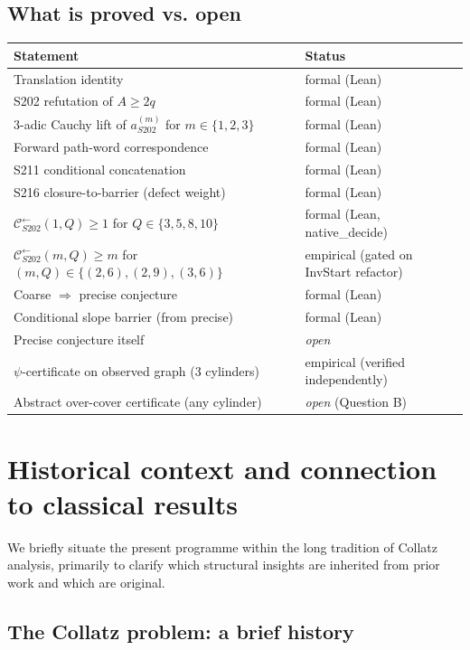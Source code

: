 \documentclass[11pt,a4paper]{article}
\theoremstyle{plain}
\theoremstyle{definition}
\newcommand{\aSat}{a_{S202}^{(m)}}
\newcommand{\Cback}{\mathcal{C}^{\!\leftarrow}_{S202}}
\begin{document}
\subsection*{What is proved vs. open}

\begin{center}\small
\begin{tabular}{p{8cm}l}
\toprule
Statement & Status \\
\midrule
Translation identity & formal (Lean) \\
S202 refutation of $A \ge 2q$ & formal (Lean) \\
3-adic Cauchy lift of $\aSat$ for $m \in \{1, 2, 3\}$ & formal (Lean) \\
Forward path-word correspondence & formal (Lean) \\
S211 conditional concatenation & formal (Lean) \\
S216 closure-to-barrier (defect weight) & formal (Lean) \\
$\Cback(1, Q) \ge 1$ for $Q \in \{3, 5, 8, 10\}$ & formal (Lean, native\_decide) \\
$\Cback(m, Q) \ge m$ for $(m, Q) \in \{(2, 6), (2, 9), (3, 6)\}$ & empirical (gated on InvStart refactor) \\
Coarse $\Rightarrow$ precise conjecture & formal (Lean) \\
Conditional slope barrier (from precise) & formal (Lean) \\
Precise conjecture itself & \emph{open} \\
$\psi$-certificate on observed graph (3 cylinders) & empirical (verified independently) \\
Abstract over-cover certificate (any cylinder) & \emph{open} (Question B) \\
\bottomrule
\end{tabular}
\end{center}

\section{Historical context and connection to classical results}\label{app:history}

We briefly situate the present programme within the long tradition
of Collatz analysis, primarily to clarify which structural insights
are inherited from prior work and which are original.

\subsection{The Collatz problem: a brief history}
\end{document}
